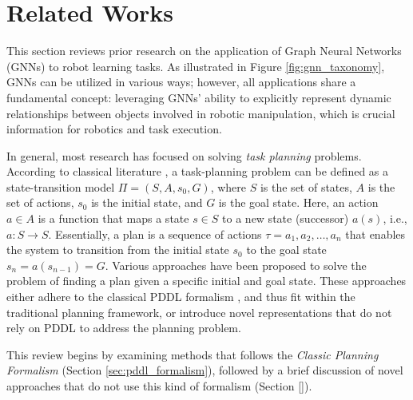 \section{Related Works}
\label{sec:gnn_related_works}
This section reviews prior research on the application of Graph Neural Networks (GNNs) to robot learning tasks. As illustrated in Figure \ref{fig:gnn_taxonomy}, GNNs can be utilized in various ways; however, all applications share a fundamental concept: leveraging GNNs' ability to explicitly represent dynamic relationships between objects involved in robotic manipulation, which is crucial information for robotics and task execution.



In general, most research has focused on solving \textit{task planning} problems. According to classical literature \cite{geffner2013concise}, a task-planning problem can be defined as a state-transition model $\Pi = \left( S, A, s_{0}, G \right)$, where $S$ is the set of states, $A$ is the set of actions, $s_{0}$ is the initial state, and $G$ is the goal state. Here, an action $a \in A$ is a function that maps a state $s \in S$ to a new state (successor) $a(s)$, i.e., $a: S \rightarrow S$. Essentially, a plan is a sequence of actions $\tau = a_{1}, a_{2}, \dots, a_{n}$ that enables the system to transition from the initial state $s_{0}$ to the goal state $s_{n} = a(s_{n-1}) = G$. Various approaches have been proposed to solve the problem of finding a plan given a specific initial and goal state. These approaches either adhere to the classical PDDL formalism \cite{aeronautiques1998pddl}, and thus fit within the traditional planning framework, or introduce novel representations that do not rely on PDDL to address the planning problem.

This review begins by examining methods that follows the \textit{Classic Planning Formalism}  (Section \ref{sec:pddl_formalism}), followed by a brief discussion of novel approaches that do not use this kind of formalism (Section \ref{}).


